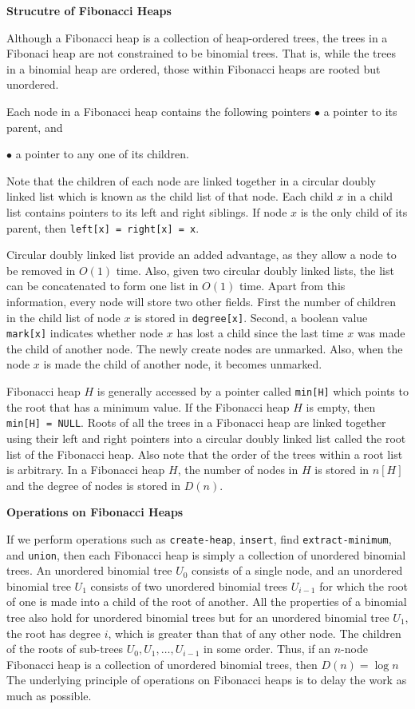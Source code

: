 \vskip 3mm
{\bf Strucutre of Fibonacci Heaps}

\vskip 1mm
Although a Fibonacci heap is a collection of heap-ordered trees, the trees in a Fibonaci heap are not constrained to be binomial trees. That is, while the trees in a binomial heap are ordered, those within Fibonacci heaps are rooted but unordered.

\vskip 1mm
Each node in a Fibonacci heap contains the following pointers
\vskip 1mm
\qquad$\bullet$ a pointer to its parent, and

\vskip 3mm
\qquad$\bullet$ a pointer to any one of its children.

\vskip 1mm
Note that the children of each node are linked together in a circular doubly linked list which is known as the child list of that node. Each child $x$ in a child list contains pointers to its left and right siblings. If node $x$ is the only child of its parent, then {\tt left[x] = right[x] = x}.

\vskip 1mm
Circular doubly linked list provide an added advantage, as they allow a node to be removed in $O(1)$ time. Also, given two circular doubly linked lists, the list can be concatenated to form one list in $O(1)$ time. Apart from this information, every node will store two other fields. First the number of children in the child list of node $x$ is stored in {\tt degree[x]}. Second, a boolean value {\tt mark[x]} indicates whether node $x$ has lost a child since the last time $x$ was made the child of another node. The newly create nodes are unmarked. Also, when the node $x$ is made the child of another node, it becomes unmarked.

\vskip 1mm
Fibonacci heap $H$ is generally accessed by a pointer called {\tt min[H]} which points to the root that has a minimum value. If the Fibonacci heap $H$ is empty, then {\tt min[H] = NULL}. Roots of all the trees in a Fibonacci heap are linked together using their left and right pointers into a circular doubly linked list called the root list of the Fibonacci heap. Also note that the order of the trees within a root list is arbitrary. In a Fibonacci heap $H$, the number of nodes in $H$ is stored in $n[H]$ and the degree of nodes is stored in $D(n)$.

\vskip 3mm
{\bf Operations on Fibonacci Heaps}

\vskip 1mm
If we perform operations such as {\tt create-heap}, {\tt insert}, find {\tt extract-minimum}, and {\tt union}, then each Fibonacci heap is simply a collection of unordered binomial trees. An unordered binomial tree $U_0$ consists of a single node, and an unordered binomial tree $U_1$ consists of two unordered binomial trees $U_{i-1}$ for which the root of one is made into a child of the root of another. All the properties of a binomial tree also hold for unordered binomial trees but for an unordered binomial tree $U_1$, the root has degree $i$, which is greater than that of any other node. The children of the roots of sub-trees $U_0,U_1,\ldots, U_{i-1}$ in some order. Thus, if an $n$-node Fibonacci heap is a collection of unordered binomial trees, then $D(n) = \log n$ The underlying principle of operations on Fibonacci heaps is to delay the work as much as possible.


